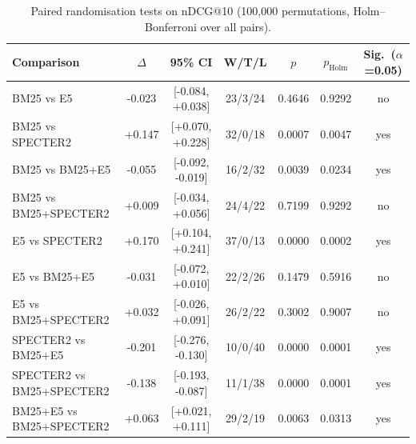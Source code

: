 \begin{table}[t]
\centering
\small
\caption{Paired randomisation tests on nDCG@10 (100,000 permutations, Holm--Bonferroni over all pairs).}
\label{tab:sig}
\begin{tabular}{lcccccc}
\toprule
Comparison & $\Delta$ & 95\% CI & W/T/L & $p$ & $p_{\text{Holm}}$ & Sig.\ ($\alpha$=0.05) \\
\midrule
BM25 vs E5 & -0.023 & [-0.084, +0.038] & 23/3/24 & 0.4646 & 0.9292 & no \\
BM25 vs SPECTER2 & +0.147 & [+0.070, +0.228] & 32/0/18 & 0.0007 & 0.0047 & yes \\
BM25 vs BM25+E5 & -0.055 & [-0.092, -0.019] & 16/2/32 & 0.0039 & 0.0234 & yes \\
BM25 vs BM25+SPECTER2 & +0.009 & [-0.034, +0.056] & 24/4/22 & 0.7199 & 0.9292 & no \\
E5 vs SPECTER2 & +0.170 & [+0.104, +0.241] & 37/0/13 & 0.0000 & 0.0002 & yes \\
E5 vs BM25+E5 & -0.031 & [-0.072, +0.010] & 22/2/26 & 0.1479 & 0.5916 & no \\
E5 vs BM25+SPECTER2 & +0.032 & [-0.026, +0.091] & 26/2/22 & 0.3002 & 0.9007 & no \\
SPECTER2 vs BM25+E5 & -0.201 & [-0.276, -0.130] & 10/0/40 & 0.0000 & 0.0001 & yes \\
SPECTER2 vs BM25+SPECTER2 & -0.138 & [-0.193, -0.087] & 11/1/38 & 0.0000 & 0.0001 & yes \\
BM25+E5 vs BM25+SPECTER2 & +0.063 & [+0.021, +0.111] & 29/2/19 & 0.0063 & 0.0313 & yes \\
\bottomrule
\end{tabular}
\end{table}
